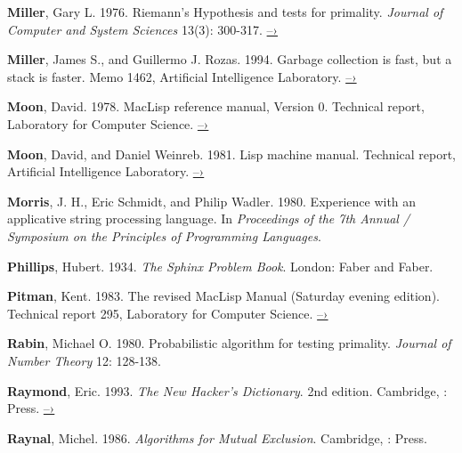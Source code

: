  \label{Miller 1976}
\textbf{Miller}, Gary L.  1976.  Riemann's Hypothesis and tests for primality.
\textit{Journal of Computer and System Sciences} 13(3): 300-317.
\href{http://www.cs.cmu.edu/~glmiller/Publications/b2hd-Mi76.html}{–›}

 \label{Miller and Rozas 1994}
\textbf{Miller}, James S., and Guillermo J. Rozas. 1994.  Garbage collection is fast,
but a stack is faster.  Memo 1462,  Artificial Intelligence
Laboratory.
\href{http://dspace.mit.edu/handle/1721.1/6622}{–›}

 \label{Moon 1978}
\textbf{Moon}, David.  1978.  MacLisp reference manual, Version 0.  Technical report,
 Laboratory for Computer Science.
\href{http://www.softwarepreservation.org/projects/LISP/MIT/Moon-MACLISP_Reference_Manual-Apr_08_1974.pdf/view}{–›}

 \label{Moon and Weinreb 1981}
\textbf{Moon}, David, and Daniel Weinreb.  1981.  Lisp machine manual.  Technical
report,  Artificial Intelligence Laboratory.
\href{http://www.unlambda.com/lmman/index.html}{–›}

\enlargethispage{\baselineskip}

 \label{Morris et al. 1980}
\textbf{Morris}, J. H., Eric Schmidt, and Philip Wadler.  1980.  Experience with an
applicative string processing language.  In \textit{Proceedings of the 7th Annual
 / Symposium on the Principles of
Programming Languages}.

 \label{Phillips 1934}
\textbf{Phillips}, Hubert.  1934. \textit{The Sphinx Problem Book}.  London: Faber and
Faber.

 \label{Pitman 1983}
\textbf{Pitman}, Kent. 1983. The revised MacLisp Manual (Saturday evening edition).
Technical report 295,  Laboratory for Computer Science.
\href{http://maclisp.info/pitmanual}{–›}

 \label{Rabin 1980}
\textbf{Rabin}, Michael O. 1980. Probabilistic algorithm for testing primality.
\textit{Journal of Number Theory} 12: 128-138.

 \label{Raymond 1993}
\textbf{Raymond}, Eric.  1993. \textit{The New Hacker's Dictionary}. 2nd edition.
Cambridge, :  Press.
\href{http://www.catb.org/jargon/}{–›}

\textbf{Raynal}, Michel. 1986. \textit{Algorithms for Mutual Exclusion}.  Cambridge, :
 Press.

